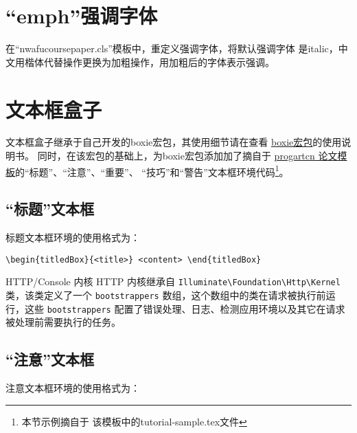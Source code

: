 \documentclass{nwafucoursepaper}
\begin{document}
\begin{table}[!htp]
\end{table}
\section{\enquote{emph}强调字体}
在\enquote{nwafucoursepaper.cls}模板中，重定义强调字体，将默认强调字体
是italic，中文用楷体代替操作更换为加粗操作，用加粗后的字体表示强调。
\section{文本框盒子}
文本框盒子继承于自己开发的boxie宏包，其使用细节请在\github{}查看
\href{https://github.com/registor/boxiesty}{boxie宏包}的使用说明书。
同时，在该宏包的基础上，为boxie宏包添加加了摘自于
\href{https://github.com/WisdomFusion/latex-templates/tree/master/progartcn}{progartcn
  论文模板}的\enquote{标题}、\enquote{注意}、\enquote{重要}、
\enquote{技巧}和\enquote{警告}文本框环境代码\footnote{本节示例摘自于
  该模板中的tutorial-sample.tex文件}。
\subsection{\enquote{标题}文本框}
标题文本框环境的使用格式为：

\verb|\begin{titledBox}{<title>} <content> \end{titledBox}|

\begin{titledBox}{HTTP/Console 内核}
  HTTP 内核继承自 \verb|Illuminate\Foundation\Http\Kernel| 类，该类定义了一个 \verb|bootstrappers| 数组，这个数组中的类在请求被执行前运行，这些 \verb|bootstrappers| 配置了错误处理、日志、检测应用环境以及其它在请求被处理前需要执行的任务。
\end{titledBox}
\subsection{\enquote{注意}文本框}
注意文本框环境的使用格式为：
\end{document}
